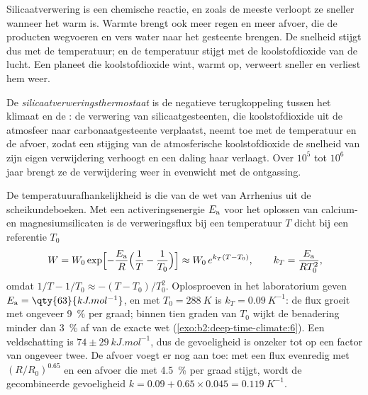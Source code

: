 Silicaatverwering is een chemische reactie, en zoals de meeste verloopt ze sneller wanneer het warm is. Warmte
brengt ook meer regen en meer afvoer, die de producten wegvoeren en vers water naar het
gesteente brengen. De snelheid stijgt dus met de temperatuur; en de temperatuur stijgt met de koolstofdioxide van
de lucht. Een planeet die koolstofdioxide wint, warmt op, verweert sneller en verliest hem weer.

\begin{definition}[Silicaatverweringsthermostaat]\label{def:b2:deep-time-climate:thermostat}
De \emph{silicaatverweringsthermostaat} is de negatieve
terugkoppeling tussen het klimaat en de : de verwering van silicaatgesteenten, die
koolstofdioxide uit de atmosfeer naar carbonaatgesteente verplaatst, neemt toe met de temperatuur en de
afvoer, zodat een stijging van de atmosferische koolstofdioxide de snelheid van zijn eigen verwijdering verhoogt en een
daling haar verlaagt. Over $10^5$ tot $10^6$ jaar brengt ze de verwijdering weer in evenwicht met de
ontgassing.
\end{definition}

De temperatuurafhankelijkheid is die van de wet van Arrhenius uit de scheikundeboeken. Met een
activeringsenergie $E_{\text a}$ voor het oplossen van calcium- en magnesiumsilicaten is de verweringsflux bij
een temperatuur $T$ dicht bij een referentie $T_0$
\[
  W = W_0 \exp\Bigl[-\frac{E_{\text a}}{R}\Bigl(\frac1T - \frac1{T_0}\Bigr)\Bigr]
  \approx W_0\, e^{k_T (T - T_0)}, \qquad k_T = \frac{E_{\text a}}{R T_0^2},
\]
omdat $1/T - 1/T_0 \approx -(T - T_0)/T_0^2$. Oplosproeven in het laboratorium geven $E_{\text a} =
\qty{63}{kJ.mol^{-1}}$, en met $T_0 = \qty{288}{K}$ is $k_T = \qty{0.09}{K^{-1}}$: de flux groeit
met ongeveer \qty{9}{\percent} per graad; binnen tien graden van $T_0$ wijkt de benadering
minder dan \qty{3}{\percent} af van de exacte wet (\cref{exo:b2:deep-time-climate:6}). Een veldschatting is
$74 \pm \qty{29}{kJ.mol^{-1}}$, dus de gevoeligheid is onzeker tot op een factor van ongeveer twee. De afvoer
voegt er nog aan toe: met een flux evenredig met $(R/R_0)^{0.65}$ en een afvoer die met
\qty{4.5}{\percent} per graad stijgt, wordt de gecombineerde gevoeligheid $k = 0.09 + 0.65\times0.045 =
\qty{0.119}{K^{-1}}$.

